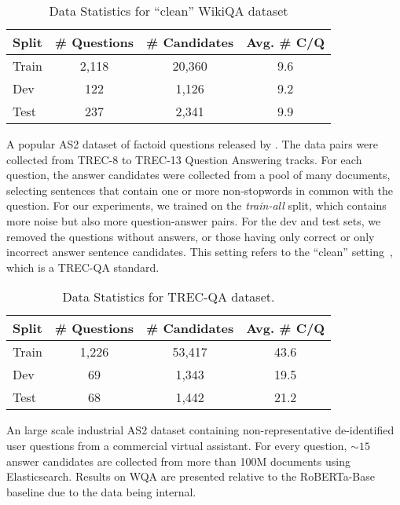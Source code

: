 \begin{table}[h!]
\centering
\small
\begin{tabular}{lccc}
\hline
    \textbf{Split} & \textbf{\# Questions} & \textbf{\# Candidates} & \textbf{Avg. \# C/Q} \\
    \hline
    Train   & 2,118 & 20,360     & 9.6 \\
    Dev     & 122   & 1,126      & 9.2 \\
    Test    & 237   & 2,341      & 9.9 \\
    \hline
\end{tabular}
\caption{Data Statistics for ``clean'' WikiQA dataset}
\vspace{1em}
\label{tab:wikiqa}
\end{table}


 A popular AS2 dataset of factoid questions released by \citeauthor{wang-etal-2007-jeopardy}. The data pairs were collected from TREC-8 to TREC-13 Question Answering tracks. For each question, the answer candidates were collected from a pool of many documents, selecting sentences that contain one or more non-stopwords in common with the question. For our experiments, we trained on the \textit{train-all} split, which contains more noise but also more question-answer pairs. For the dev and test sets, we removed the questions without answers, or those having only correct or only incorrect answer sentence candidates. This setting refers to the ``clean'' setting~\cite{shen-etal-2017-inter}, which is a TREC-QA standard.

\begin{table}[h!]
\centering
\small
\begin{tabular}{lccc}
\hline
    \textbf{Split} & \textbf{\# Questions} & \textbf{\# Candidates} & \textbf{Avg. \# C/Q} \\
    \hline
    Train   & 1,226 & 53,417     & 43.6 \\
    Dev     & 69    & 1,343      & 19.5 \\
    Test    & 68    & 1,442      & 21.2 \\
    \hline
\end{tabular}
\caption{Data Statistics for TREC-QA dataset.}
\vspace{1em}
\label{tab:trecqa}
\end{table}


 An large scale industrial AS2 dataset containing non-representative de-identified user questions from a commercial virtual assistant. For every question, ${\sim}15$ answer candidates are collected from more than 100M documents using Elasticsearch. Results on WQA are presented relative to the RoBERTa-Base baseline due to the data being internal.

